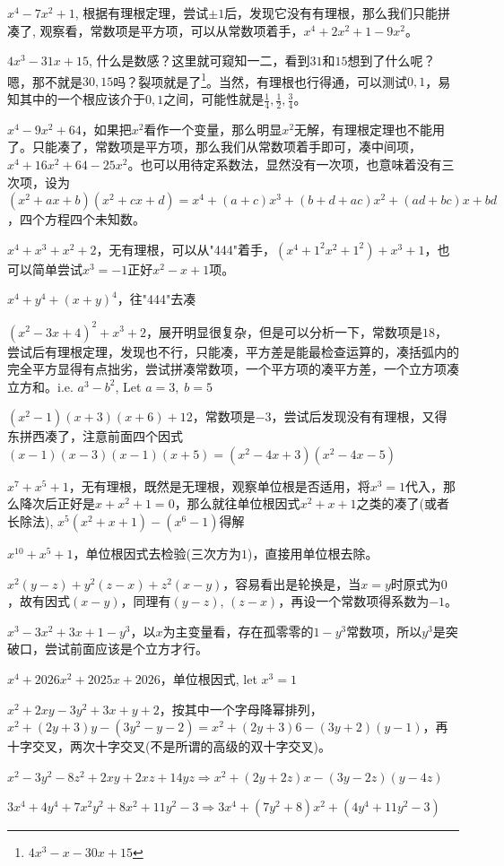 \documentclass[../main.tex]{subfiles}
\begin{document}
$x^4-7x^2+1$, 根据有理根定理，尝试$\pm 1$后，发现它没有有理根，那么我们只能拼凑了, 观察看，常数项是平方项，可以从常数项着手，$x^4+2x^2+1-9x^2$。

$4x^3-31x+15$, 什么是数感？这里就可窥知一二，看到$31$和$15$想到了什么呢？嗯，那不就是$30, 15$吗？裂项就是了\footnote{$4x^3-x-30x+15$}。当然，有理根也行得通，可以测试$0,1$，易知其中的一个根应该介于$0,1$之间，可能性就是$\frac{1}{4}, \frac{1}{2}, \frac{3}{4}$。

$x^4-9x^2+64$，如果把$x^2$看作一个变量，那么明显$x^2$无解，有理根定理也不能用了。只能凑了，常数项是平方项，那么我们从常数项着手即可，凑中间项，$x^4+16x^2+64-25x^2$。也可以用待定系数法，显然没有一次项，也意味着没有三次项，设为$(x^2+ax+b)(x^2+cx+d)=x^4+(a+c)x^3+(b+d+ac)x^2+(ad+bc)x+bd$，四个方程四个未知数。

$x^4+x^3+x^2+2$，无有理根，可以从"444"着手，$(x^4+1^2x^2+1^2)+x^3+1$，也可以简单尝试$x^3=-1$正好$x^2-x+1$项。

$x^4+y^4+(x+y)^4$，往"444"去凑

$(x^2-3x+4)^2+x^3+2$，展开明显很复杂，但是可以分析一下，常数项是$18$，尝试后有理根定理，发现也不行，只能凑，平方差是能最检查运算的，凑括弧内的完全平方显得有点拙劣，尝试拼凑常数项，一个平方项的凑平方差，一个立方项凑立方和。i.e. $a^3-b^2$, Let $a=3, \; b=5$

$(x^2-1)(x+3)(x+6)+12$，常数项是$-3$，尝试后发现没有有理根，又得东拼西凑了，注意前面四个因式$(x-1)(x-3)(x-1)(x+5)=(x^2-4x+3)(x^2-4x-5)$

$x^7+x^5+1$，无有理根，既然是无理根，观察单位根是否适用，将$x^3=1$代入，那么降次后正好是$x+x^2+1=0$，那么就往单位根因式$x^2+x+1$之类的凑了(或者长除法), $x^5(x^2+x+1)-(x^6-1)$得解

$x^{10}+x^5+1$，单位根因式去检验(三次方为$1$)，直接用单位根去除。

$x^2(y-z)+y^2(z-x)+z^2(x-y)$，容易看出是轮换是，当$x=y$时原式为$0$，故有因式$(x-y)$，同理有$(y-z)$, $(z-x)$，再设一个常数项得系数为$-1$。

$x^3-3x^2+3x+1-y^3$，以$x$为主变量看，存在孤零零的$1-y^3$常数项，所以$y^3$是突破口，尝试前面应该是个立方才行。

$x^4+2026x^2+2025x+2026$，单位根因式, let $x^3=1$

$x^2+2xy-3y^2+3x+y+2$，按其中一个字母降幂排列，$x^2+(2y+3)y-(3y^2-y-2)=x^2+(2y+3)6-(3y+2)(y-1)$，再十字交叉，两次十字交叉(不是所谓的高级的双十字交叉)。

$x^2-3y^2-8z^2+2xy+2xz+14yz \Rightarrow x^2+(2y+2z)x-(3y-2z)(y-4z)$

$3x^4+4y^4+7x^2y^2+8x^2+11y^2-3 \Rightarrow 3x^4+(7y^2+8)x^2+(4y^4+11y^2-3)$
\end{document}
